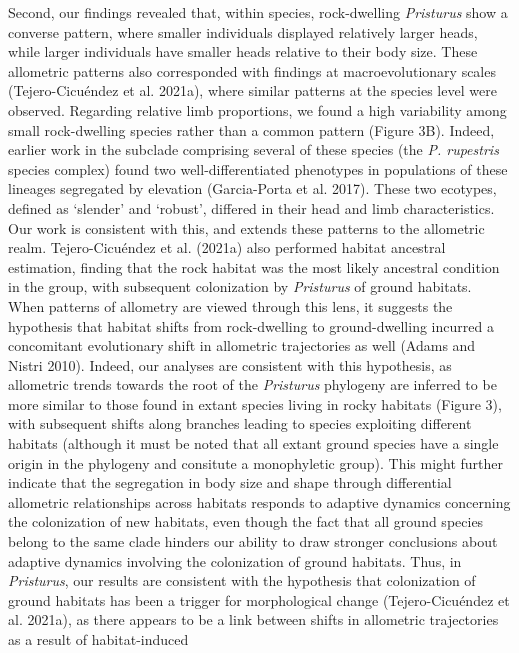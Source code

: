 \documentclass[
  11pt,
]{article}
\begin{document}
Second, our findings revealed that, within species, rock-dwelling
\emph{Pristurus} show a converse pattern, where smaller individuals
displayed relatively larger heads, while larger individuals have smaller
heads relative to their body size. These allometric patterns also
corresponded with findings at macroevolutionary scales (Tejero-Cicuéndez
et al. 2021a), where similar patterns at the species level were
observed. Regarding relative limb proportions, we found a high
variability among small rock-dwelling species rather than a common
pattern (Figure 3B). Indeed, earlier work in the subclade comprising
several of these species (the \emph{P. rupestris} species complex) found
two well-differentiated phenotypes in populations of these lineages
segregated by elevation (Garcia-Porta et al. 2017). These two ecotypes,
defined as `slender' and `robust', differed in their head and limb
characteristics. Our work is consistent with this, and extends these
patterns to the allometric realm. Tejero-Cicuéndez et al. (2021a) also
performed habitat ancestral estimation, finding that the rock habitat
was the most likely ancestral condition in the group, with subsequent
colonization by \emph{Pristurus} of ground habitats. When patterns of
allometry are viewed through this lens, it suggests the hypothesis that
habitat shifts from rock-dwelling to ground-dwelling incurred a
concomitant evolutionary shift in allometric trajectories as well (Adams
and Nistri 2010). Indeed, our analyses are consistent with this
hypothesis, as allometric trends towards the root of the
\emph{Pristurus} phylogeny are inferred to be more similar to those
found in extant species living in rocky habitats (Figure 3), with
subsequent shifts along branches leading to species exploiting different
habitats (although it must be noted that all extant ground species have
a single origin in the phylogeny and consitute a monophyletic group).
This might further indicate that the segregation in body size and shape
through differential allometric relationships across habitats responds
to adaptive dynamics concerning the colonization of new habitats, even
though the fact that all ground species belong to the same clade hinders
our ability to draw stronger conclusions about adaptive dynamics
involving the colonization of ground habitats. Thus, in
\emph{Pristurus}, our results are consistent with the hypothesis that
colonization of ground habitats has been a trigger for morphological
change (Tejero-Cicuéndez et al. 2021a), as there appears to be a link
between shifts in allometric trajectories as a result of habitat-induced
\end{document}
